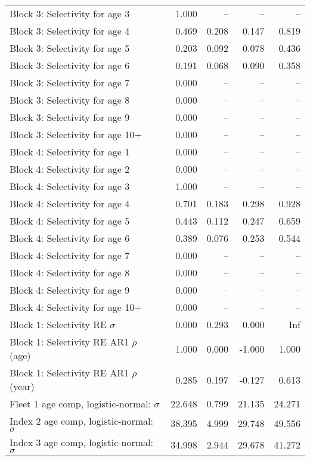 \documentclass[
]{article}
\begin{document}
\begin{landscape}
\begin{longtable}[t]{lrrrr}
Block 3: Selectivity for age 3 & 1.000 & -- & -- & --\\
Block 3: Selectivity for age 4 & 0.469 & 0.208 & 0.147 & 0.819\\
Block 3: Selectivity for age 5 & 0.203 & 0.092 & 0.078 & 0.436\\
Block 3: Selectivity for age 6 & 0.191 & 0.068 & 0.090 & 0.358\\
Block 3: Selectivity for age 7 & 0.000 & -- & -- & --\\
\addlinespace
Block 3: Selectivity for age 8 & 0.000 & -- & -- & --\\
Block 3: Selectivity for age 9 & 0.000 & -- & -- & --\\
Block 3: Selectivity for age 10+ & 0.000 & -- & -- & --\\
Block 4: Selectivity for age 1 & 0.000 & -- & -- & --\\
Block 4: Selectivity for age 2 & 0.000 & -- & -- & --\\
\addlinespace
Block 4: Selectivity for age 3 & 1.000 & -- & -- & --\\
Block 4: Selectivity for age 4 & 0.701 & 0.183 & 0.298 & 0.928\\
Block 4: Selectivity for age 5 & 0.443 & 0.112 & 0.247 & 0.659\\
Block 4: Selectivity for age 6 & 0.389 & 0.076 & 0.253 & 0.544\\
Block 4: Selectivity for age 7 & 0.000 & -- & -- & --\\
\addlinespace
Block 4: Selectivity for age 8 & 0.000 & -- & -- & --\\
Block 4: Selectivity for age 9 & 0.000 & -- & -- & --\\
Block 4: Selectivity for age 10+ & 0.000 & -- & -- & --\\
Block 1: Selectivity RE $\sigma$ & 0.000 & 0.293 & 0.000 & Inf\\
Block 1: Selectivity RE AR1 $\rho$ (age) & 1.000 & 0.000 & -1.000 & 1.000\\
\addlinespace
Block 1: Selectivity RE AR1 $\rho$ (year) & 0.285 & 0.197 & -0.127 & 0.613\\
Fleet 1 age comp, logistic-normal: $\sigma$ & 22.648 & 0.799 & 21.135 & 24.271\\
Index 2 age comp, logistic-normal: $\sigma$ & 38.395 & 4.999 & 29.748 & 49.556\\
Index 3 age comp, logistic-normal: $\sigma$ & 34.998 & 2.944 & 29.678 & 41.272\\*
\end{longtable}
\end{landscape}
\end{document}
